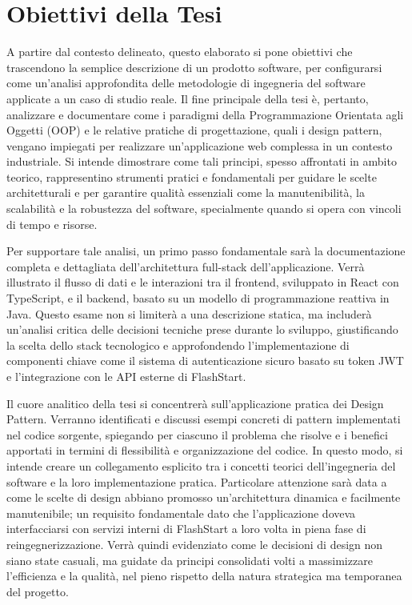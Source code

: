 \documentclass[12pt,a4paper,openright,twoside]{book}
\begin{document}
\section{Obiettivi della Tesi}
\label{sec:obiettivi_tesi}

A partire dal contesto delineato, questo elaborato si pone obiettivi che trascendono la semplice descrizione di un prodotto software, per configurarsi come un'analisi approfondita delle metodologie di ingegneria del software applicate a un caso di studio reale. Il fine principale della tesi è, pertanto, analizzare e documentare come i paradigmi della Programmazione Orientata agli Oggetti (OOP) e le relative pratiche di progettazione, quali i design pattern, vengano impiegati per realizzare un'applicazione web complessa in un contesto industriale. Si intende dimostrare come tali principi, spesso affrontati in ambito teorico, rappresentino strumenti pratici e fondamentali per guidare le scelte architetturali e per garantire qualità essenziali come la manutenibilità, la scalabilità e la robustezza del software, specialmente quando si opera con vincoli di tempo e risorse.

Per supportare tale analisi, un primo passo fondamentale sarà la documentazione completa e dettagliata dell'architettura full-stack dell'applicazione. Verrà illustrato il flusso di dati e le interazioni tra il frontend, sviluppato in React con TypeScript, e il backend, basato su un modello di programmazione reattiva in Java. Questo esame non si limiterà a una descrizione statica, ma includerà un'analisi critica delle decisioni tecniche prese durante lo sviluppo, giustificando la scelta dello stack tecnologico e approfondendo l'implementazione di componenti chiave come il sistema di autenticazione sicuro basato su token JWT e l'integrazione con le API esterne di FlashStart.

Il cuore analitico della tesi si concentrerà sull'applicazione pratica dei Design Pattern. Verranno identificati e discussi esempi concreti di pattern implementati nel codice sorgente, spiegando per ciascuno il problema che risolve e i benefici apportati in termini di flessibilità e organizzazione del codice. In questo modo, si intende creare un collegamento esplicito tra i concetti teorici dell'ingegneria del software e la loro implementazione pratica. Particolare attenzione sarà data a come le scelte di design abbiano promosso un'architettura dinamica e facilmente manutenibile; un requisito fondamentale dato che l'applicazione doveva interfacciarsi con servizi interni di FlashStart a loro volta in piena fase di reingegnerizzazione. Verrà quindi evidenziato come le decisioni di design non siano state casuali, ma guidate da principi consolidati volti a massimizzare l'efficienza e la qualità, nel pieno rispetto della natura strategica ma temporanea del progetto.
\end{document}
